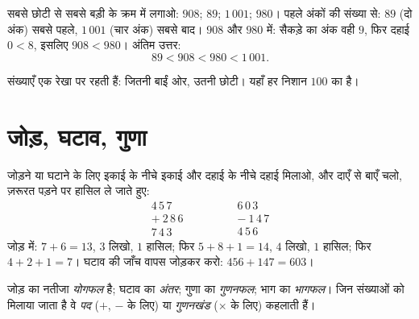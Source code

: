 \begin{example}\label{ex:g6:wholes:order}
सबसे छोटी से सबसे बड़ी के क्रम में लगाओ: $908$; $89$; $1\,001$; $980$।
पहले अंकों की संख्या से: $89$ (दो अंक) सबसे पहले, $1\,001$ (चार
अंक) सबसे बाद। $908$ और $980$ में: सैकड़े का अंक वही $9$, फिर
दहाई $0 < 8$, इसलिए $908 < 980$। अंतिम उत्तर:
\[
89 < 908 < 980 < 1\,001 .
\]
\end{example}

\begin{omfigure}

{\small संख्याएँ एक रेखा पर रहती हैं: जितनी बाईं ओर, उतनी छोटी।
यहाँ हर निशान $100$ का है।}
\end{omfigure}

\section{जोड़, घटाव, गुणा}

\begin{example}[खानों में गणना]\label{ex:g6:wholes:columns}
जोड़ने या घटाने के लिए इकाई के नीचे इकाई और दहाई के नीचे दहाई
मिलाओ, और दाएँ से बाएँ चलो, ज़रूरत पड़ने पर हासिल ले जाते हुए:
\[
\begin{array}{r}
4\,5\,7 \\
+\ 2\,8\,6 \\
\hline
7\,4\,3
\end{array}
\qquad\qquad
\begin{array}{r}
6\,0\,3 \\
-\ 1\,4\,7 \\
\hline
4\,5\,6
\end{array}
\]
जोड़ में: $7 + 6 = 13$, $3$ लिखो, $1$ हासिल; फिर
$5 + 8 + 1 = 14$, $4$ लिखो, $1$ हासिल; फिर $4 + 2 + 1 = 7$।
घटाव की जाँच वापस जोड़कर करो: $456 + 147 = 603$।
\end{example}

\begin{remark}[शब्दावली]
जोड़ का नतीजा \emph{योगफल} है; घटाव का
\emph{अंतर}; गुणा का
\emph{गुणनफल}; भाग का
\emph{भागफल}। जिन संख्याओं को मिलाया जाता है वे
\emph{पद} ($+$, $-$ के लिए) या \emph{गुणनखंड} ($\times$ के लिए) कहलाती हैं।
\end{remark}


